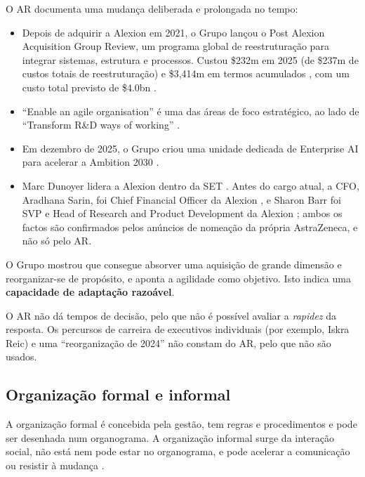 O AR documenta uma mudança deliberada e prolongada no tempo:

\begin{itemize}
\item Depois de adquirir a Alexion em 2021, o Grupo lançou o Post Alexion Acquisition Group Review, um programa global de reestruturação para integrar sistemas, estrutura e processos. Custou \$232m em 2025 (de \$237m de custos totais de reestruturação) e \$3,414m em termos acumulados \cite[p.~142]{AR}, com um custo total previsto de \$4.0bn \cite[p.~59]{AR}.
\item ``Enable an agile organisation'' é uma das áreas de foco estratégico, ao lado de ``Transform R\&D ways of working'' \cite[p.~11]{AR}.
\item Em dezembro de 2025, o Grupo criou uma unidade dedicada de Enterprise AI para acelerar a Ambition 2030 \cite[p.~36]{AR}.
\item Marc Dunoyer lidera a Alexion dentro da SET \cite[p.~70]{AR}. Antes do cargo atual, a CFO, Aradhana Sarin, foi Chief Financial Officer da Alexion \cite{SARIN21}, e Sharon Barr foi SVP e Head of Research and Product Development da Alexion \cite{BARR23}; ambos os factos são confirmados pelos anúncios de nomeação da própria AstraZeneca, e não só pelo AR.
\end{itemize}

\begin{analysis}
O Grupo mostrou que consegue absorver uma aquisição de grande dimensão e reorganizar-se de propósito, e aponta a agilidade como objetivo. Isto indica uma \textbf{capacidade de adaptação razoável}.
\end{analysis}

\begin{sourceslimit}
O AR não dá tempos de decisão, pelo que não é possível avaliar a \textit{rapidez} da resposta. Os percursos de carreira de executivos individuais (por exemplo, Iskra Reic) e uma ``reorganização de 2024'' não constam do AR, pelo que não são usados.
\end{sourceslimit}

\subsection{Organização formal e informal}

A organização formal é concebida pela gestão, tem regras e procedimentos e pode ser desenhada num organograma. A organização informal surge da interação social, não está nem pode estar no organograma, e pode acelerar a comunicação ou resistir à mudança \cite[pp.~12--13]{ORG}.

